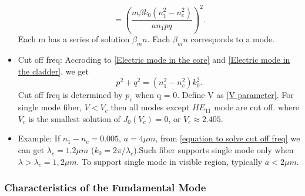 \documentclass[12pt]{extarticle}
\numberwithin{equation}{section}
\numberwithin{figure}{section}
\numberwithin{table}{section}
\newcommand{\<}{\langle}
\renewcommand{\>}{\rangle}
\theoremstyle{definition}
\begin{document}
\begin{itemize}
                    \begin{equation}
                        [\frac{J_m^{'} (pa)}{pJ_m(pa)}+\frac{K_m^{'} (qa)}{qK_m(qa)}][\frac{J_m^{'} (pa)}{pJ_m(pa)}+\frac{n_c^2}{n_1^2}\frac{K_m^{'} (qa)}{qK_m(qa)}]=(\frac{m\beta k_0(n_1^2-n_c^2)}{an_1 pq})^2.
                        \label{eigen value equation of beta}
                    \end{equation}
                    Each m has a series of solution $\beta_mn$. Each $\beta_mn$ corresponds to a mode.
                \item Cut off freq: Accroding to \autoref{Electric mode in the core} and \autoref{Electric mode in the cladder}, we get
                    \begin{equation}
                        p^2+q^2=(n_1^2-n_c^2)k_0^2.
                        \label{equation to solve cut off freq}
                    \end{equation}
                    Cut off freq is determined by $p_c$ when q = 0. Define V as \autoref{V parameter}. For single mode fiber, $V<V_c$ then all modes except $HE_{11}$ mode are cut off. where $V_c$ is the smallest solution of $J_0(V_c)=0$, or $V_c\approx 2.405$.
                \item Example: If $n_1-n_c=0.005$, $a=4\mu m$, from \autoref{equation to solve cut off freq} we can get $\lambda_c=1.2\mu m$ ($k_0=2\pi/\lambda_c$).Such fiber supports single mode only when $\lambda>\lambda_c=1,2\mu m$. To support single mode in visible region, typically $a<2\mu m$.
             \end{itemize}
        \subsubsection{Characteristics of the Fundamental Mode}
            




\end{document}
